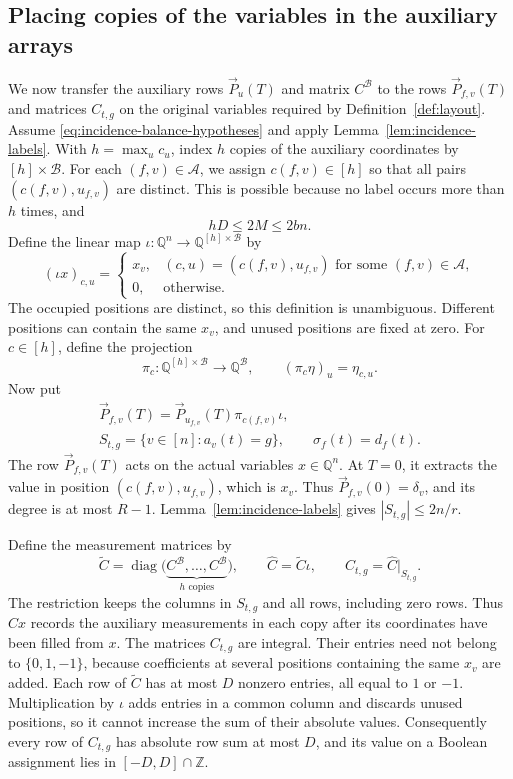\documentclass[11pt,reqno]{amsart}
\numberwithin{equation}{section}
\theoremstyle{definition}\newtheorem{definition}[theorem]{Definition}
\theoremstyle{remark}\newtheorem{remark}[theorem]{Remark}
\renewcommand{\le}{\leqslant}
\begin{document}
\subsection{Placing copies of the variables in the auxiliary arrays}\label{subsec:embedding}
We now transfer the auxiliary rows $\vec{P}_u(T)$ and matrix
$C^{\mathcal B}$ to the rows $\vec{P}_{f,v}(T)$ and matrices $C_{t,g}$
on the original variables required by Definition~\ref{def:layout}.
Assume \eqref{eq:incidence-balance-hypotheses} and apply
Lemma~\ref{lem:incidence-labels}. With $h=\max_u c_u$, index $h$
copies of the auxiliary coordinates by $[h]\times\mathcal B$.
For each $(f,v)\in\mathcal A$, we assign $c(f,v)\in[h]$ so that all
pairs $(c(f,v),u_{f,v})$ are distinct. This is possible because no
label occurs more than $h$ times, and
\[
 hD\le2M\le2bn.
\]
Define the linear map
$\iota:\mathbb Q^n\longrightarrow\mathbb Q^{[h]\times\mathcal B}$ by
\[
 (\iota x)_{c,u}=
 \begin{cases}
 x_v,&(c,u)=(c(f,v),u_{f,v})\text{ for some }(f,v)\in\mathcal A,\\
 0,&\text{otherwise}.
 \end{cases}
\]
The occupied positions are distinct, so this definition is unambiguous.
Different positions can contain the same $x_v$, and unused positions
are fixed at zero. For $c\in[h]$, define the projection
\[
 \pi_c:\mathbb Q^{[h]\times\mathcal B}\longrightarrow\mathbb Q^{\mathcal B},
 \qquad (\pi_c\eta)_u=\eta_{c,u}.
\]
Now put
\begin{equation}\label{eq:actual-rows}
 \begin{gathered}
 \vec{P}_{f,v}(T)=\vec{P}_{u_{f,v}}(T)\pi_{c(f,v)}\iota,\\
 S_{t,g}=\{v\in[n]:a_v(t)=g\},\qquad \sigma_f(t)=d_f(t).
 \end{gathered}
\end{equation}
The row $\vec{P}_{f,v}(T)$ acts on the actual variables $x\in\mathbb Q^n$.
At $T=0$, it extracts the value in position $(c(f,v),u_{f,v})$,
which is $x_v$. Thus $\vec{P}_{f,v}(0)=\delta_v$, and its degree is at most
$R-1$. Lemma~\ref{lem:incidence-labels} gives $|S_{t,g}|\le2n/r$.

Define the measurement matrices by
\begin{equation}\label{eq:actual-measurements}
 \widetilde C=\operatorname{diag}
   \bigl(\underbrace{C^{\mathcal B},\ldots,C^{\mathcal B}}_{h\text{ copies}}\bigr),
 \qquad \widehat C=\widetilde C\iota,
 \qquad C_{t,g}=\widehat C|_{S_{t,g}}.
\end{equation}
The restriction keeps the columns in $S_{t,g}$ and all rows, including
zero rows. Thus $\widehat Cx$ records the auxiliary measurements in
each copy after its coordinates have been filled from $x$.
The matrices $C_{t,g}$ are integral. Their entries need not belong to
$\{0,1,-1\}$, because coefficients at several positions containing
the same $x_v$ are added. Each row of $\widetilde C$ has at
most $D$ nonzero entries, all equal to $1$ or $-1$. Multiplication by
$\iota$ adds entries in a common column and discards unused positions,
so it cannot increase
the sum of their absolute values. Consequently every row of $C_{t,g}$
has absolute row sum at most $D$, and its value on a Boolean assignment
lies in $[-D,D]\cap\mathbb Z$.
\end{document}
